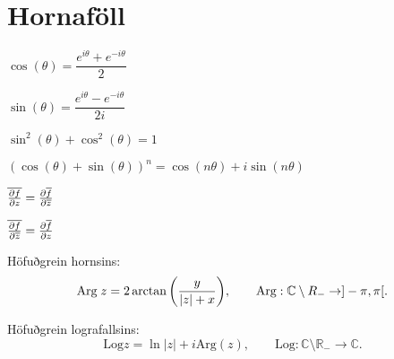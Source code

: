 \noindent
\section*{Hornaföll}

\begin{minipage}{.5\linewidth}
  $\cos(\theta) = \dfrac{e^{i \theta}+e^{-i\theta}}{2}$
\end{minipage}%
\begin{minipage}{.5\linewidth}
	$\sin(\theta) = \dfrac{e^{i \theta}-e^{-i\theta}}{2i}$
\end{minipage}

\begin{minipage}{.5\linewidth}
  $\sin^2(\theta) + \cos^2(\theta) =1$
\end{minipage}%
\begin{minipage}{.5\linewidth}
	$(\cos(\theta)+\sin(\theta))^n = \cos(n\theta)+i\sin(n\theta)$
\end{minipage}

\begin{minipage}{.5\linewidth}
	$\overline {{\frac{\partial f}{\partial z}}} = {\frac{\partial  \overline{f}}{\partial \overline z}}$
\end{minipage}%
\begin{minipage}{.5\linewidth}
	$\overline {{\frac{\partial f}{\partial \overline z}}} = {\frac{\partial \overline{f}}{\partial z}}$
\end{minipage}

\begin{minipage}{1\linewidth}
Höfuðgrein hornsins:
\begin{equation*}
  \text{Arg} \; z = 2 \arctan \bigg(\frac{y}{|z| + x} \biggl), \qquad
		  \text{Arg}: {\mathbb C} \setminus R_- \to ]-\pi,\pi[.
\end{equation*}
\end{minipage}
%
\begin{minipage}{1\linewidth}
\noindent Höfuðgrein lografallsins:
\begin{equation*}
      \text{Log} z = \ln |z| + i \text{Arg}(z), \qquad \text{Log}: \mathbb{C} \setminus \mathbb{R_{-}} \to \mathbb{C}.
\end{equation*}
\end{minipage}
